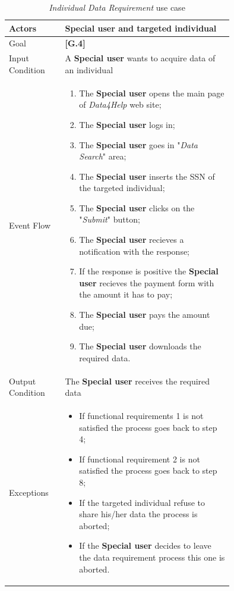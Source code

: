 \begin{center}
\begin{table}
\begin{tabular}{ | l | p{0.75\linewidth} | }
  \hline
    Actors & \textbf{Special user} and targeted individual \\ \hline
    Goal & \textbf{[G.4]} \\ \hline
    Input Condition & A \textbf{Special user} wants to acquire data of an individual \\ \hline
    Event Flow & \begin{minipage}[t]{0.7\textwidth}
      \begin{enumerate}
        \item The \textbf{Special user} opens the main page of \textit{Data4Help} web site;
        \item The \textbf{Special user} logs in;
        \item The \textbf{Special user} goes in "\textit{Data Search}" area;
        \item The \textbf{Special user} inserts the SSN of the targeted individual;
        \item The \textbf{Special user} clicks on the "\textit{Submit}" button;
        \item The \textbf{Special user} recieves a notification with the response;
        \item If the response is positive the \textbf{Special user} recieves the payment form with the amount it has to pay;
        \item The \textbf{Special user} pays the amount due;
        \item The \textbf{Special user} downloads the required data.
      \end{enumerate}
    \smallskip
  \end{minipage} \\ \hline
  Output Condition & The \textbf{Special user} receives the required data \\ \hline
  Exceptions & \begin{minipage}[t]{0.7\textwidth}
    \begin{itemize}
      \smallskip
      \item If functional requirements 1 is not satisfied the process goes back to step 4;
      \item If functional requirement 2 is not satisfied the process goes back to step 8;
      \item If the targeted individual refuse to share his/her data the process is aborted;
      \item If the \textbf{Special user} decides to leave the data requirement process this one is aborted.
    \end{itemize}
    \smallskip
  \end{minipage}  \\ \hline
\end{tabular}
\caption{\textit{Individual Data Requirement} use case}
\label{table:individualDataRequirement}
\end{table}
\end{center}

